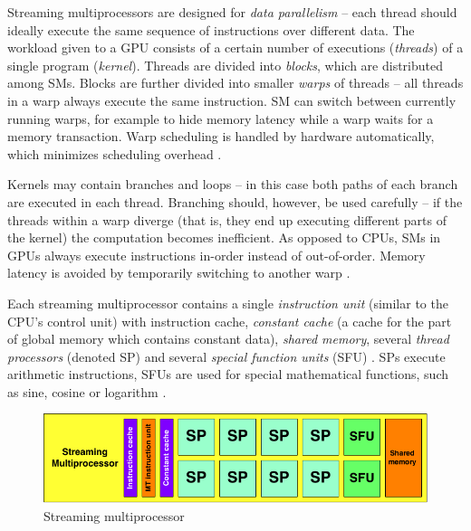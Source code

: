 \documentclass[12pt,oneside]{fithesis2}
\begin{document}
      
      Streaming multiprocessors are designed for \emph{data parallelism} -- each thread should ideally execute the same sequence of instructions over different data. The workload given to a GPU consists of a certain number of executions (\emph{threads}) of a single program (\emph{kernel}). Threads are divided into \emph{blocks}, which are distributed among SMs. Blocks are further divided into smaller \emph{warps} of threads -- all threads in a warp always execute the same instruction. SM can switch between currently running warps, for example to hide memory latency while a warp waits for a memory transaction. Warp scheduling is handled by hardware automatically, which minimizes scheduling overhead \cite{nvidia:gpuArch}.
      
      Kernels may contain branches and loops -- in this case both paths of each branch are executed in each thread. Branching should, however, be used carefully -- if the threads within a warp diverge (that is, they end up executing different parts of the kernel) the computation becomes inefficient. As opposed to CPUs, SMs in GPUs always execute instructions in-order instead of out-of-order. Memory latency is avoided by temporarily switching to another warp \cite{nvidia:gpuArch}.
            
      Each streaming multiprocessor contains a single \emph{instruction unit} (similar to the CPU's control unit) with instruction cache, \emph{constant cache} (a cache for the part of global memory which contains constant data), \emph{shared memory}, several \emph{thread processors} (denoted SP) and several \emph{special function units} (SFU) \cite{nvidia:gpuArch}. SPs execute arithmetic instructions, SFUs are used for special mathematical functions, such as sine, cosine or logarithm \cite{nvidia:gpuArch}.
      
      \begin{figure}
        \centering
        \includegraphics[width=\linewidth]{images/sm.png}
        \caption{Streaming multiprocessor}
      \end{figure}
      
\end{document}
